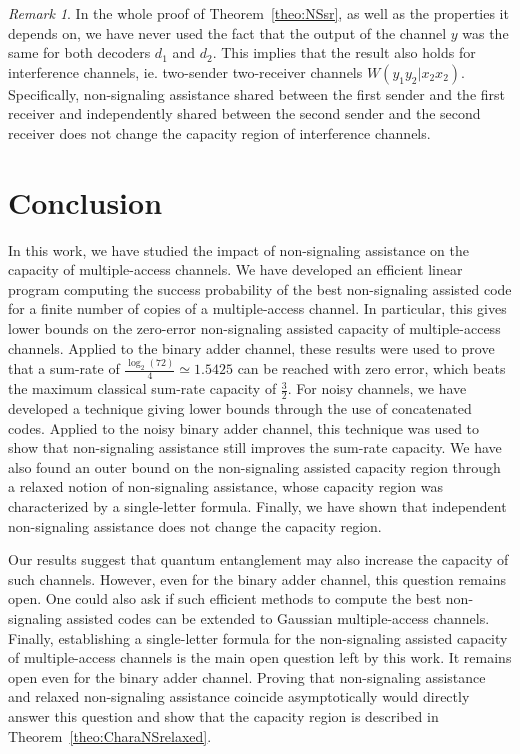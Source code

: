 \documentclass[11pt]{article}
\theoremstyle{definition}
\theoremstyle{remark}
\newtheorem*{rk}{Remark}
\begin{document}
\begin{rk}
  In the whole proof of Theorem~\ref{theo:NSsr}, as well as the properties it depends on, we have never used the fact that the output of the channel $y$ was the same for both decoders $d_1$ and $d_2$. This implies that the result also holds for interference channels, ie. two-sender two-receiver channels $W(y_1y_2|x_2x_2)$. Specifically, non-signaling assistance shared between the first sender and the first receiver and independently shared between the second sender and the second receiver does not change the capacity region of interference channels.
\end{rk}
  
\section{Conclusion}
In this work, we have studied the impact of non-signaling assistance on the capacity of multiple-access channels. We have developed an efficient linear program computing the success probability of the best non-signaling assisted code for a finite number of copies of a multiple-access channel. In particular, this gives lower bounds on the zero-error non-signaling assisted capacity of multiple-access channels.
Applied to the binary adder channel, these results were used to prove that a sum-rate of $\frac{\log_2(72)}{4} \simeq 1.5425$ can be reached with zero error, which beats the maximum classical sum-rate capacity of $\frac{3}{2}$. For noisy channels, we have developed a technique giving lower bounds through the use of concatenated codes. Applied to the noisy binary adder channel, this technique was used to show that non-signaling assistance still improves the sum-rate capacity. We have also found an outer bound on the non-signaling assisted capacity region through a relaxed notion of non-signaling assistance, whose capacity region was characterized by a single-letter formula. Finally, we have shown that independent non-signaling assistance does not change the capacity region.

Our results suggest that quantum entanglement may also increase the capacity of such channels. However, even for the binary adder channel, this question remains open. One could also ask if such efficient methods to compute the best non-signaling assisted codes can be extended to Gaussian multiple-access channels. Finally, establishing a single-letter formula for the non-signaling assisted capacity of multiple-access channels is the main open question left by this work. It remains open even for the binary adder channel. Proving that non-signaling assistance and relaxed non-signaling assistance coincide asymptotically would directly answer this question and show that the capacity region is described in Theorem~\ref{theo:CharaNSrelaxed}.
\end{document}
